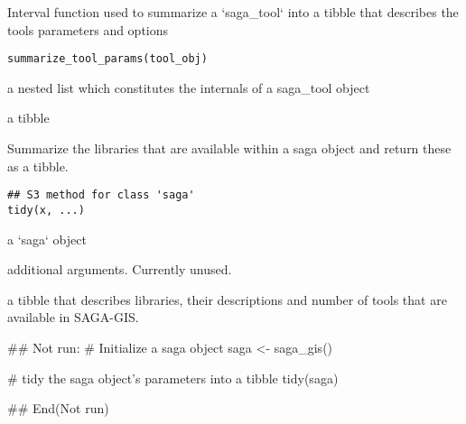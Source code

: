 \documentclass[a4paper]{book}
\begin{document}
%
\begin{Description}
Interval function used to summarize a `saga\_tool` into a tibble that
describes the tools parameters and options
\end{Description}
%
\begin{Usage}
\begin{verbatim}
summarize_tool_params(tool_obj)
\end{verbatim}
\end{Usage}
%
\begin{Arguments}
\begin{ldescription}
\item[\code{tool\_obj}] a nested list which constitutes the internals of a saga\_tool
object
\end{ldescription}
\end{Arguments}
%
\begin{Value}
a tibble
\end{Value}
%
\begin{Description}
Summarize the libraries that are available within a saga object and
return these as a tibble.
\end{Description}
%
\begin{Usage}
\begin{verbatim}
## S3 method for class 'saga'
tidy(x, ...)
\end{verbatim}
\end{Usage}
%
\begin{Arguments}
\begin{ldescription}
\item[\code{x}] a `saga` object

\item[\code{...}] additional arguments. Currently unused.
\end{ldescription}
\end{Arguments}
%
\begin{Value}
a tibble that describes libraries, their descriptions and number of
tools that are available in SAGA-GIS.
\end{Value}
%
\begin{Examples}
\begin{ExampleCode}
## Not run: 
# Initialize a saga object
saga <- saga_gis()

# tidy the saga object's parameters into a tibble
tidy(saga)

## End(Not run)
\end{ExampleCode}
\end{Examples}
\end{document}
